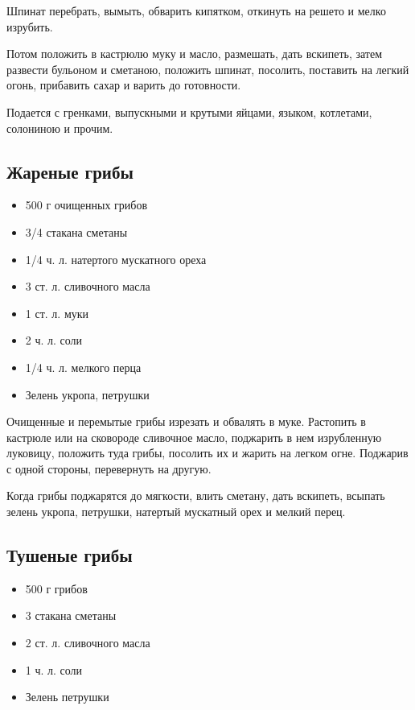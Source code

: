 Шпинат перебрать, вымыть, обварить кипятком, откинуть на решето и мелко изрубить.

Потом положить в кастрюлю муку и масло, размешать, дать вскипеть, затем развести бульоном и сметаною, положить шпинат, посолить, поставить на легкий огонь, прибавить сахар и варить до готовности.

Подается с гренками, выпускными и крутыми яйцами, языком, котлетами, солониною и прочим.

\subsection{Жареные грибы}

\begin{itemize}
	\item 500 г очищенных грибов 
    \item 3/4 стакана сметаны 
    \item 1/4 ч. л. натертого мускатного ореха 
    \item 3 ст. л. сливочного масла 
    \item 1 ст. л. муки 
    \item 2 ч. л. соли 
    \item 1/4 ч. л. мелкого перца 
    \item Зелень укропа, петрушки
\end{itemize}

Очищенные и перемытые грибы изрезать и обвалять в муке. Растопить в кастрюле или на сковороде сливочное масло, поджарить в нем изрубленную луковицу, положить туда грибы, посолить их и жарить на легком огне. Поджарив с одной стороны, перевернуть на другую.

Когда грибы поджарятся до мягкости, влить сметану, дать вскипеть, всыпать зелень укропа, петрушки, натертый мускатный орех и мелкий перец.

\subsection{Тушеные грибы}

\begin{itemize}
	\item 500 г грибов 
    \item 3 стакана сметаны 
    \item 2 ст. л. сливочного масла 
    \item 1 ч. л. соли 
    \item Зелень петрушки
\end{itemize}

